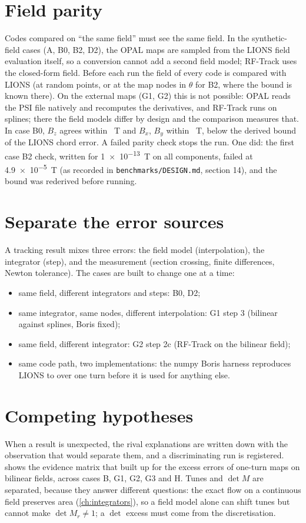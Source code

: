 \section{Field parity}
Codes compared on ``the same field'' must see the same field.
In the synthetic-field cases (A, B0, B2, D2), the OPAL maps are sampled from the LIONS field evaluation itself, so a
conversion cannot add a second field model; RF-Track uses the closed-form field.
Before each run the field of every code is compared with LIONS (at random points, or at the map nodes in $\theta$ for
B2, where the bound is known there).
On the external maps (G1, G2) this is not possible: OPAL reads the PSI file natively and recomputes the derivatives,
and RF-Track runs on splines; there the field models differ by design and the comparison measures that.
In case B0, $B_z$ agrees within \BzeroParityBz~T and $B_x$, $B_y$ within \BzeroParityBxy~T, below the derived bound of
the LIONS chord error.
A failed parity check stops the run.
One did: the first case B2 check, written for \num{1e-13}~T on all components, failed at \num{4.9e-5}~T (as recorded in
\nolinkurl{benchmarks/DESIGN.md}, section 14), and the bound was rederived before running.

\section{Separate the error sources}
A tracking result mixes three errors: the field model (interpolation), the integrator (step), and the measurement
(section crossing, finite differences, Newton tolerance).
The cases are built to change one at a time:
\begin{itemize}
\item same field, different integrators and steps: B0, D2;
\item same integrator, same nodes, different interpolation: G1 step 3 (bilinear against splines, Boris fixed);
\item same field, different integrator: G2 step 2c (RF-Track on the bilinear field);
\item same code path, two implementations: the numpy Boris harness reproduces LIONS to \GValidationMax{} over one turn before it is used
for anything else.
\end{itemize}

\section{Competing hypotheses}
When a result is unexpected, the rival explanations are written down with the observation that would separate them,
and a discriminating run is registered.
 shows the evidence matrix that built up for the excess errors of one-turn maps on bilinear fields,
across cases B, G1, G2, G3 and H.
Tunes and $\det M$ are separated, because they answer different questions: the exact flow on a continuous field
preserves area (\cref{ch:integrators}), so a field model alone can shift tunes but cannot make $\det M_r\ne1$; a
$\det$ excess must come from the discretisation.

